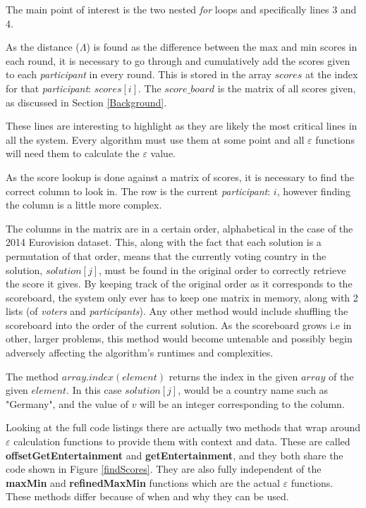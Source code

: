 \documentclass[12pt]{report}
\begin{document}
The main point of interest is the two nested \textit{for} loops and specifically lines 3 and 4.

As the distance ($\Lambda$) is found as the difference between the max and min scores in each round, it is necessary to go through and cumulatively add the scores given to each \textit{participant} in every round. This is stored in the array $scores$ at the index for that \textit{participant}: $scores[i]$. The $score\_board$ is the matrix of all scores given, as discussed in Section \ref{Background}. 

These lines are interesting to highlight as they are likely the most critical lines in all the system. Every algorithm must use them at some point and all $\varepsilon$ functions will need them to calculate the $\varepsilon$ value.

As the score lookup is done against a matrix of scores, it is necessary to find the correct column to look in. The row is the current \textit{participant}: $i$, however finding the column is a little more complex. 

The columns in the matrix are in a certain order, alphabetical in the case of the 2014 Eurovision dataset. This, along with the fact that each solution is a permutation of that order, means that the currently voting country in the solution, $solution[j]$, must be found in the original order to correctly retrieve the score it gives. By keeping track of the original order as it corresponds to the scoreboard, the system only ever has to keep one matrix in memory, along with 2 lists (of \textit{voters} and \textit{participants}). Any other method would include shuffling the scoreboard into the order of the current solution. As the scoreboard grows i.e in other, larger problems, this method would become untenable and possibly begin adversely affecting the algorithm's runtimes and complexities.

The method $array.index(element)$ returns the index in the given $array$ of the given $element$. In this case $solution[j]$, would be a country name such as "Germany", and the value of $v$ will be an integer corresponding to the column.

Looking at the full code listings there are actually two methods that wrap around $\varepsilon$ calculation functions to provide them with context and data. These are called \textbf{offsetGetEntertainment} and \textbf{getEntertainment}, and they both share the code shown in Figure \ref{findScores}. They are also fully independent of the \textbf{maxMin} and \textbf{refinedMaxMin} functions which are the actual $\varepsilon$ functions. These methods differ because of when and why they can be used.
\end{document}
